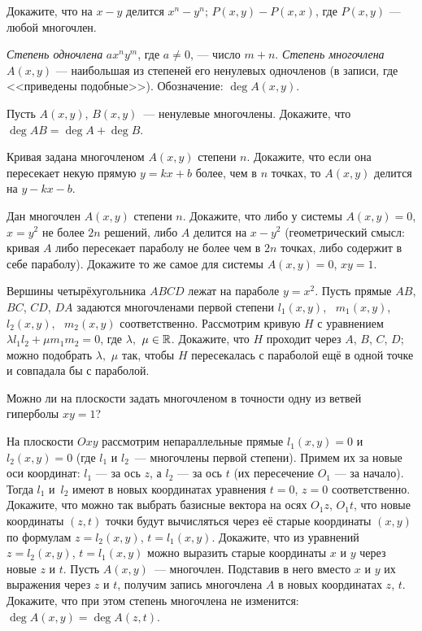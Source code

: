 \documentclass[a4paper, 11pt]{article}
\begin{document}


\noindent

Докажите, что на $x-y$ делится  $x^n-y^n$;  $P(x,y)-P(x,x)$, где $P(x,y)$ --- любой многочлен.


{\em Степень одночлена} $ax^ny^m$, где $a\ne0$, --- число $m+n$. {\em Степень многочлена} $A(x,y)$ --- наибольшая из степеней его ненулевых одночленов (в записи, где <<приведены подобные>>). Обозначение: $\deg A (x,y)$.

 Пусть $A(x,y)$, $B(x,y)$~--- ненулевые многочлены.
Докажите, что $\deg AB = \deg A + \deg B$.

Кривая задана многочленом $A(x,y)$ степени $n$. Докажите, что если она пересекает некую прямую $y=kx+b$ более, чем в $n$ точках, то $A(x,y)$ делится на $y-kx-b$.

Дан многочлен $A(x,y)$ степени $n$.
 Докажите, что либо у системы $A(x,y)=0$, $x=y^2$ не более $2n$ решений, либо
$A$ делится на $x-y^2$ (геометрический смысл: кривая $A$ либо пересекает параболу не более чем в $2n$ точках,
либо содержит в себе параболу).
 Докажите то же самое для системы $A(x,y)=0$, $xy=1$.


Вершины четырёхугольника $ABCD$ лежат на параболе $y=x^2$.
Пусть прямые $AB$, $BC$, $CD$, $DA$ задаются многочленами
первой степени $l_1(x,y)$, \ $m_1(x,y)$, \ $l_2(x,y)$, \ $m_2(x,y)$ соответственно.
Рассмотрим кривую $H$ с уравнением $\lambda l_1l_2+\mu m_1m_2=0$, где $\lambda,$ $\mu\in\mathbb{R}$.
Докажите, что
 $H$ проходит через $A$, $B$, $C$, $D$;
 можно подобрать $\lambda,$ $\mu$ так, чтобы $H$ пересекалась с параболой ещё в одной точке и совпадала бы с параболой.

 Можно ли на плоскости задать многочленом в точности одну из ветвей гиперболы $xy=1$?



 На плоскости $Oxy$ рассмотрим
непараллельные  прямые $l_1(x,y) = 0$ и $l_2(x,y) = 0$ (где $l_1$ и $l_2$~--- многочлены первой степени).
Примем их за новые оси координат: $l_1$ --- за ось $z$, а $l_2$ --- за ось
$t$ (их пересечение $O_1$ --- за начало). Тогда $l_1$ и~$l_2$ имеют в новых координатах уравнения $t = 0$, $z = 0$ соответственно.
\\
 Докажите, что можно так выбрать базисные вектора на осях
$O_1z$, $O_1t$, что новые координаты $(z,t)$ точки будут вычисляться
через её старые координаты $(x,y)$ по формулам $z = l_2(x,y)$, $t =
l_1(x,y)$.  Докажите, что из уравнений $z = l_2(x,y)$, $t =
l_1(x,y)$ можно выразить старые координаты $x$ и $y$ через новые $z$
и $t$.  Пусть $A(x,y)$~--- многочлен. Подставив в него вместо
$x$ и $y$ их выражения через $z$ и $t$, получим запись многочлена
$A$ в новых координатах $z$, $t$. Докажите, что при этом степень
многочлена не изменится: $\deg A(x,y) = \deg A(z,t)$.
\end{document}
